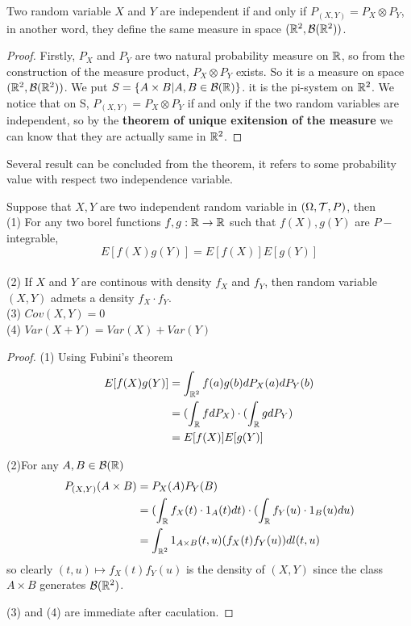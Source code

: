 \documentclass[en,geye,blue,normal,12pt,bibend=bibtex]{elegantnote}
\begin{document}
\begin{theorem}
    Two random variable \(X\) and \(Y\) are independent if and only if \(P_{(X,Y)} = P_X \otimes P_Y\), in another word, they define the same measure in space \((\mathbb{R}^2, \mathcal{B}(\mathbb{R}^2))\).

    \begin{proof}
        Firstly, \(P_X\) and \(P_Y\) are two natural probability measure on \(\mathbb{R}\), so from the construction of the measure product, \(P_X \otimes P_Y\) exists. So it is a measure on space \((\mathbb{R}^2,\mathcal{B}(\mathbb{R}^2))\). We put \(S = \{A \times B| A,B \in \mathcal{B}(\mathbb{R})\}\). it is the pi-system on \(\mathbb{R}^2\). We notice that on S,  \(P_{(X,Y)}=P_X \otimes P_Y \) if and only if the two random variables are independent, so by the \textbf{theorem of unique exitension of the measure} we can know that they are actually same in \(\mathbb{R}^2\).
    \end{proof}
\end{theorem}
Several result can be concluded from the theorem, it refers to some probability value with respect two independence variable.

\begin{corollary}
    Suppose that \(X,Y\) are two independent random variable in \((\Omega ,\mathcal{T} ,P)\), then
    \\(1) For any two borel functions \(f,g: \mathbb{R} \to \mathbb{R}\) such that \(f(X),g(Y)\) are \(P-\)integrable,\[E[f(X)g(Y)] = E[f(X)]E[g(Y)]\]
    \\(2) If \(X\) and \(Y\) are continous with density \(f_X \) and \(f_Y\), then random variable \((X,Y)\) admets a density \(f_X\cdot f_Y\).
    \\(3) \(Cov(X,Y) = 0\)
    \\(4) \(Var(X+Y) = Var(X)+Var(Y)\)

    \begin{proof}
        (1) Using Fubini's theorem \begin{align*}
            E[f(X)g(Y)] &= \int_{\mathbb{R}^2} f(a)g(b) dP_X(a)dP_Y(b) \\
            &= (\int_{\mathbb{R}} fdP_X) \cdot (\int_{\mathbb{R}} gdP_Y) \\
            &= E[f(X)]E[g(Y)]
        \end{align*}

        (2)For any \(A,B \in \mathcal{B}(\mathbb{R})\)  \begin{align*}
            P_{(X,Y)}(A \times B) &= P_X(A)P_Y(B) \\
            &= (\int_{\mathbb{R}} f_X(t) \cdot 1_A(t) dt) \cdot (\int_{\mathbb{R}} f_Y(u) \cdot 1_B(u) du) \\
            &= \int_{\mathbb{R}^2} 1_{A \times B}(t,u)(f_X(t)f_Y(u))dl(t,u) 
        \end{align*}
        so clearly \((t,u) \mapsto f_X(t)f_Y(u)\) is the density of \((X,Y)\) since the class \({A \times B}\) generates \(\mathcal{B}(\mathbb{R}^2)\).

        (3) and (4) are immediate after caculation.
    \end{proof}
\end{corollary}
\end{document}
